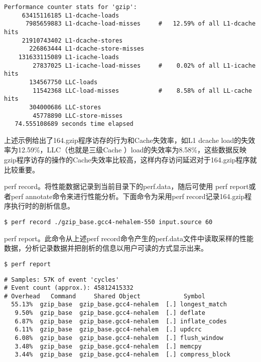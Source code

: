 \documentclass[]{ctexbook}
\begin{document}
\begin{verbatim}
Performance counter stats for 'gzip':
     63415116185 L1-dcache-loads                             
      7985659883 L1-dcache-load-misses     #   12.59% of all L1-dcache hits   
     21910743402 L1-dcache-stores                             
       226863444 L1-dcache-store-misses                        
    131633115089 L1-icache-loads                              
        27837025 L1-icache-load-misses     #    0.02% of all L1-icache hits   
       134567750 LLC-loads                             
        11542368 LLC-load-misses           #    8.58% of all LL-cache hits    
       304000686 LLC-stores                            
        45778890 LLC-store-misses                          
   74.555108689 seconds time elapsed
\end{verbatim}

上述示例给出了164.gzip程序访存的行为和Cache失效率，如L1 dcache load的失效率为12.59\%，LLC（也就是三级Cache ）load的失效率为8.58\%，这些数据反映gzip程序访存的操作的Cache失效率比较高，这样内存访问延迟对于164.gzip程序就比较重要。

perf record。将性能数据记录到当前目录下的perf.data，随后可使用 perf report或者perf annotate命令来进行性能分析。下面命令为采用perf record记录164.gzip程序执行时的剖析信息。

\texttt{\$\ perf\ record\ ./gzip\_base.gcc4-nehalem-550\ input.source\ 60}

perf report。此命令从上述perf record命令产生的perf.data文件中读取采样的性能数据，分析记录数据并把剖析的信息以用户可读的方式显示出来。

\texttt{\$\ perf\ report}

\begin{verbatim}
# Samples: 57K of event 'cycles'
# Event count (approx.): 45812415332
# Overhead   Command     Shared Object            Symbol
  55.13%  gzip_base  gzip_base.gcc4-nehalem  [.] longest_match                       
   9.50%  gzip_base  gzip_base.gcc4-nehalem  [.] deflate                             
   6.87%  gzip_base  gzip_base.gcc4-nehalem  [.] inflate_codes                       
   6.11%  gzip_base  gzip_base.gcc4-nehalem  [.] updcrc                              
   6.08%  gzip_base  gzip_base.gcc4-nehalem  [.] flush_window                        
   3.48%  gzip_base  gzip_base.gcc4-nehalem  [.] memcpy                              
   3.44%  gzip_base  gzip_base.gcc4-nehalem  [.] compress_block                     
\end{verbatim}
\end{document}
